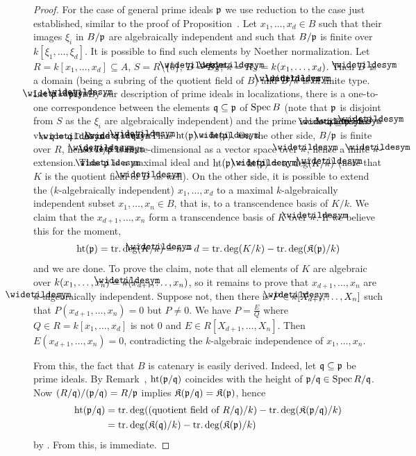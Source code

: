 \documentclass[a4paper,parskip=half,numbers=enddot, DIV=12]{scrreprt}
\begin{document}
\begin{proof}
		For the case of general prime ideals $\mathfrak{p}$ we use reduction to the case just established, similar to the proof of Proposition~. Let $x_1,\ldots,x_d\in B$ such that their images $\xi_i$ in $B/\mathfrak{p}$ are algebraically independent and such that $B/\mathfrak{p}$ is finite over $k[\xi_1,\ldots,\xi_d]$. It is possible to find such elements by Noether normalization. Let $R=k[x_1,\ldots,x_d]\subseteq A$, $S = R\setminus\{0\}$, $\snake B = B_S$, $\snake k = R_S = k(x_1,\ldots, x_d)$. Then $\snake B$ is a domain (being a subring of the quotient field of $B$) and $\snake B/\snake k$ is of finite type. Let $\snake\pp = \pp \snake B$. By our description of prime ideals in localizations, there is a one-to-one correspondence between the elements $\mathfrak{q}\subseteq\mathfrak{p}$ of $\operatorname{Spec} B$ (note that $\mathfrak{p}$ is disjoint from $S$ as the $\xi_i$ are algebraically independent) and the prime ideals $\snake\qq\subseteq\snake{\pp}$ of $\snake B$ via $\qq = \snake \qq\cap B$ and $\snake \qq = \qq \snake B$. Thus $\hoehe(\pp) = \hoehe(\snake\pp)$. On the other side, $B/\mathfrak{p}$ is finite over $R$, hence $\snake B/\snake \pp$ is finite-dimensional as a vector space over $\snake k$, hence a finite $\snake k$-extension. Thus $\snake \pp$ is a maximal ideal and $\hoehe(\pp) = \hoehe(\snake \pp) = \trdeg(K/\snake k)$ (note that $K$ is the quotient field of $\snake B$ as well). On the other side, it is possible to extend the ($k$-algebraically independent) $x_1,\ldots,x_d$ to a maximal $k$-algebraically independent subset $x_1,\ldots,x_n\in B$, that is, to a transcendence basis of $K/k$. We claim that the $x_{d+1},\ldots,x_n$ form a transcendence basis of $K$ over $\snake k$. If we believe this for the moment, 
		\begin{align*}
			\hoehe(\pp) = \trdeg(K/\snake k) = n-d = \trdeg(K/k) -\trdeg(\KK(\pp)/k)
		\end{align*}
		and we are done. To prove the claim, note that all elements of $K$ are algebraic over $k(x_1,\ldots,x_n) = \snake k (x_{d+1},\ldots, x_n)$, so it remains to prove that $x_{d+1},\ldots,x_n$ are $\snake k$-algebraically independent. Suppose not, then there is $P\in\snake k [X_{d+1},\ldots, X_n]$ such that $P(x_{d+1},\ldots,x_n) = 0$ but $P\not=0$. We have $P=\frac{E}{Q}$ where $Q\in R = k[x_1,\ldots,x_d]$ is not $0$ and $E\in R[X_{d+1},\ldots, X_n]$. Then $E (x_{d+1},\ldots,x_n) = 0$, contradicting the $k$-algebraic independence of $x_1,\ldots, x_n$.
		
		From this, the fact that $B$ is catenary is easily derived. Indeed, let $\mathfrak{q}\subseteq\mathfrak{p}$ be prime ideals. By Remark~, $\operatorname{ht}(\mathfrak{p}/\mathfrak{q})$ coincides with the height of $\mathfrak{p}/\mathfrak{q}\in\operatorname{Spec} R/\mathfrak{q}$. Now $(R/\mathfrak{q})/(\mathfrak{p}/\mathfrak{q})=R/\mathfrak{p}$ implies $\mathfrak{K}(\mathfrak{p}/\mathfrak{q})=\mathfrak{K}(\mathfrak{p})$, hence
		\begin{align*}
			\operatorname{ht}(\mathfrak{p}/\mathfrak{q})&=\operatorname{tr.deg}((\text{quotient field of }R/\mathfrak{q})/k)-\operatorname{tr.deg}(\mathfrak{K}(\mathfrak{p}/\mathfrak{q})/k)\\
			&=\operatorname{tr.deg}(\mathfrak{K}(\mathfrak{q})/k)-\operatorname{tr.deg}(\mathfrak{K}(\mathfrak{p})/k)
		\end{align*}
		by . From this,  is immediate. 
	\end{proof}
\end{document}
